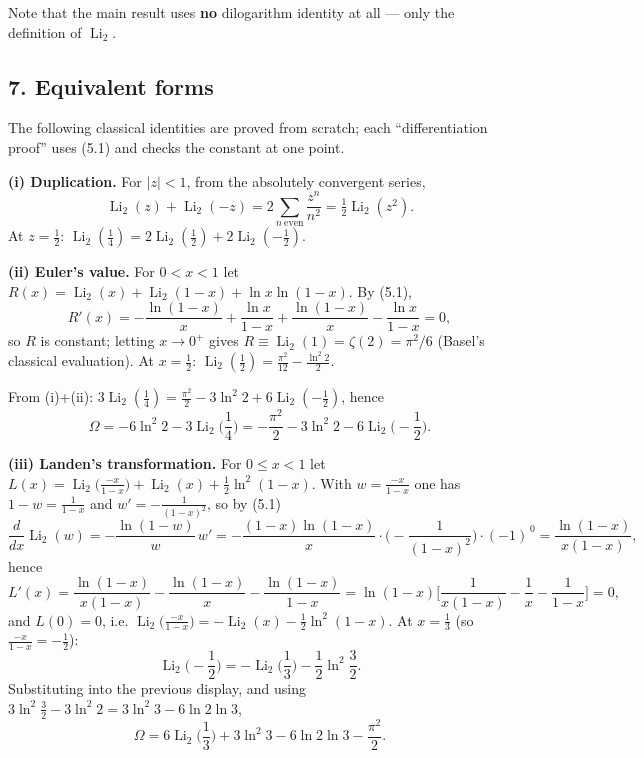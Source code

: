 \documentclass[11pt]{article}
\theoremstyle{remark}
\begin{document}
Note that the main result uses \textbf{no} dilogarithm identity at all --- only the definition of $\operatorname{Li}_2$.

\subsection*{7. Equivalent forms}

The following classical identities are proved from scratch; each ``differentiation proof'' uses (5.1) and checks the constant at one point.

\textbf{(i) Duplication.} For $|z|<1$, from the absolutely convergent series,
$$\operatorname{Li}_{2}(z)+\operatorname{Li}_{2}(-z)=2\sum_{n\ \mathrm{even}}\frac{z^{n}}{n^{2}}=\tfrac12\operatorname{Li}_{2}(z^{2}).$$
At $z=\tfrac12$: $\operatorname{Li}_{2}(\tfrac14)=2\operatorname{Li}_{2}(\tfrac12)+2\operatorname{Li}_{2}(-\tfrac12)$.

\textbf{(ii) Euler's value.} For $0<x<1$ let $R(x)=\operatorname{Li}_{2}(x)+\operatorname{Li}_{2}(1-x)+\ln x\ln(1-x)$. By (5.1),
$$R'(x)=-\frac{\ln(1-x)}{x}+\frac{\ln x}{1-x}+\frac{\ln(1-x)}{x}-\frac{\ln x}{1-x}=0 ,$$
so $R$ is constant; letting $x\to0^{+}$ gives $R\equiv\operatorname{Li}_{2}(1)=\zeta(2)=\pi^{2}/6$ (Basel's classical evaluation). At $x=\tfrac12$: $\operatorname{Li}_{2}(\tfrac12)=\frac{\pi^{2}}{12}-\frac{\ln^{2}2}{2}$.

From (i)+(ii): $3\operatorname{Li}_{2}(\tfrac14)=\frac{\pi^{2}}{2}-3\ln^{2}2+6\operatorname{Li}_{2}(-\tfrac12)$, hence
$$\Omega=-6\ln^{2}2-3\operatorname{Li}_{2}\!\Big(\frac14\Big)
=-\frac{\pi^{2}}{2}-3\ln^{2}2-6\operatorname{Li}_{2}\!\Big(-\frac12\Big).$$

\textbf{(iii) Landen's transformation.} For $0\le x<1$ let $L(x)=\operatorname{Li}_{2}\!\big(\frac{-x}{1-x}\big)+\operatorname{Li}_{2}(x)+\tfrac12\ln^{2}(1-x)$. With $w=\frac{-x}{1-x}$ one has $1-w=\frac{1}{1-x}$ and $w'=-\frac{1}{(1-x)^{2}}$, so by (5.1)
$$\frac{d}{dx}\operatorname{Li}_{2}(w)=-\frac{\ln(1-w)}{w}\,w'
=-\frac{(1-x)\ln(1-x)}{x}\cdot\Big(-\frac{1}{(1-x)^{2}}\Big)\cdot(-1)^{\,0}
=\frac{\ln(1-x)}{x(1-x)} ,$$
hence
$$L'(x)=\frac{\ln(1-x)}{x(1-x)}-\frac{\ln(1-x)}{x}-\frac{\ln(1-x)}{1-x}
=\ln(1-x)\Big[\frac{1}{x(1-x)}-\frac1x-\frac{1}{1-x}\Big]=0 ,$$
and $L(0)=0$, i.e. $\operatorname{Li}_{2}\!\big(\frac{-x}{1-x}\big)=-\operatorname{Li}_{2}(x)-\frac12\ln^{2}(1-x)$. At $x=\tfrac13$ (so $\frac{-x}{1-x}=-\tfrac12$):
$$\operatorname{Li}_{2}\!\Big(-\frac12\Big)=-\operatorname{Li}_{2}\!\Big(\frac13\Big)-\frac12\ln^{2}\frac32 .$$
Substituting into the previous display, and using $3\ln^{2}\frac32-3\ln^{2}2=3\ln^{2}3-6\ln2\ln3$,
$$\Omega=6\operatorname{Li}_{2}\!\Big(\frac13\Big)+3\ln^{2}3-6\ln2\ln3-\frac{\pi^{2}}{2}.$$
\end{document}
